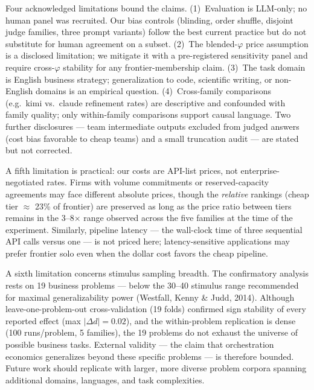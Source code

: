 \documentclass[12pt,a4paper]{article}
\newcommand{\phiBlend}{\varphi}
\begin{document}
Four acknowledged limitations bound the claims. (1)~Evaluation is LLM-only; no
human panel was recruited. Our bias controls (blinding, order shuffle, disjoint
judge families, three prompt variants) follow the best current practice
\citep{ZhengEtAl2023, VergaEtAl2024} but do not substitute for human agreement
on a subset. (2)~The blended-$\phiBlend$ price assumption is a disclosed
limitation; we mitigate it with a pre-registered sensitivity panel and require
cross-$\phiBlend$ stability for any frontier-membership claim. (3)~The task
domain is English business strategy; generalization to code, scientific writing,
or non-English domains is an empirical question. (4)~Cross-family comparisons
(e.g.\ kimi vs.\ claude refinement rates) are descriptive and confounded with
family quality; only within-family comparisons support causal language. Two
further disclosures --- team intermediate outputs excluded from judged answers
(cost bias favorable to cheap teams) and a small truncation audit --- are stated
but not corrected.

A fifth limitation is practical: our costs are API-list prices, not
enterprise-negotiated rates. Firms with volume commitments or reserved-capacity
agreements may face different absolute prices, though the \emph{relative}
rankings (cheap tier $\approx$ 23\% of frontier) are preserved as long as the
price ratio between tiers remains in the 3--8$\times$ range observed across the
five families at the time of the experiment. Similarly, pipeline latency --- the
wall-clock time of three sequential API calls versus one --- is not priced here;
latency-sensitive applications may prefer frontier solo even when the dollar
cost favors the cheap pipeline.

A sixth limitation concerns stimulus sampling breadth. The confirmatory
analysis rests on 19 business problems --- below the 30--40 stimulus range
recommended for maximal generalizability power (Westfall, Kenny \& Judd,
2014). Although leave-one-problem-out cross-validation (19 folds)
confirmed sign stability of every reported effect (max $|\Delta d| = 0.02$),
and the within-problem replication is dense (100 runs/problem, 5
families), the 19 problems do not exhaust the universe of possible
business tasks. External validity --- the claim that orchestration
economics generalizes beyond these specific problems --- is therefore
bounded. Future work should replicate with larger, more diverse problem
corpora spanning additional domains, languages, and task complexities.

\end{document}
